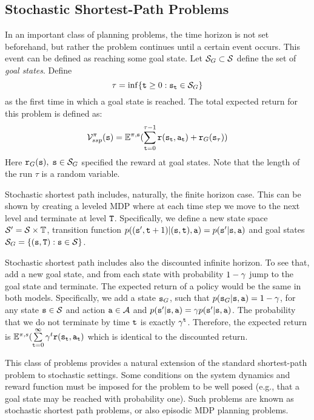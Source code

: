 \subsection{Stochastic Shortest-Path Problems}
In an important class of planning problems, the time horizon is not
set beforehand, but rather the problem continues until a certain
event occurs. This event can be defined as reaching some goal state.
Let  ${\mathcal{S}_G} \subset \mathcal{S}$ define the set of \emph{goal
states}. Define
\[\tau  = \inf \{ {\tt t} \ge 0:{{\tt s}_{\tt t}} \in {\mathcal{S}_G}\} \]
as the first time in which a goal state is reached. The total expected return for this problem is defined as:
\[\mathcal{V}_{ssp}^\pi ({\tt s}) = {\mathbb{E}^{\pi ,{\tt s}}}(\sum\limits_{{\tt t} = 0}^{\tau  - 1} {{\tt r}({{\tt s}_{\tt t}},{{\tt a}_{\tt t}})}  + {{\tt r}_G}({{\tt s}_\tau }))\]
Here ${{\tt r}_G}({\tt s}),\;{\tt s} \in {\mathcal{S}_G}$ specified the
reward at goal states. Note that the length of the run $\tau$ is a random variable.



Stochastic shortest path includes, naturally, the finite horizon case. This can be shown by creating a leveled MDP where at each time step we move to the next level and terminate at level ${\tt T}$.
Specifically, we define a new state space $\mathcal{S}'=\mathcal{S}\times \mathbb{T}$, transition function $p(({\tt s}',{\tt t}+1)|({\tt s},{\tt t}),{\tt a})=p({\tt s}'|{\tt s},{\tt a})$ and goal states $\mathcal{S}_G=\{({\tt s},{\tt T}):{\tt s} \in\mathcal{S}\}$.

Stochastic shortest path includes also the discounted infinite
horizon. To see that, add a new goal state, and from each state with
probability $1-\gamma$ jump to the goal state and terminate. The
expected return of a policy would be the same in both models.
Specifically, we add a state ${\tt s}_G$, such that
$p({\tt s}_G|{\tt s},{\tt a})=1-\gamma$, for any state
${\tt s}\in\mathcal{S}$ and action ${\tt a}\in\mathcal{A}$ and
$p({\tt s}'|{\tt s},{\tt a})=\gamma p({\tt s}'|{\tt s},{\tt a})$. The
probability that we do not terminate by time ${\tt t}$ is exactly
$\gamma^{\tt t}$. Therefore, the expected return is ${\mathbb{E}^{\pi ,s}}(\sum\limits_{{\tt t} = 0}^\infty  {{\gamma^t}{\tt r}({{\tt s}_{\tt t}},{{\tt a}_{\tt t}})}$
which is
identical to the discounted return.

This class of problems provides a natural extension of the standard
shortest-path problem to stochastic settings.  Some conditions on
the system dynamics and reward function must be imposed for the
problem to be well posed (e.g., that a goal state may be reached
with probability one). Such problems are known as stochastic
shortest path problems, or also episodic MDP planning problems. 

